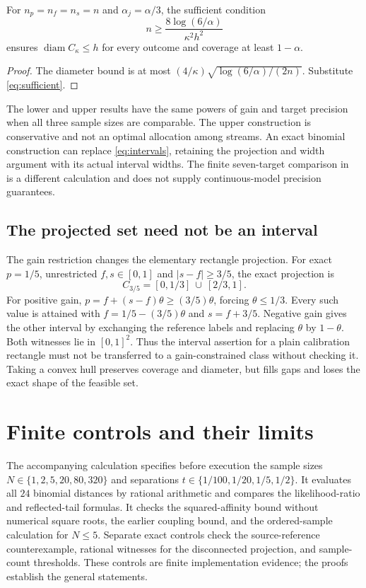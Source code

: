 \documentclass[11pt,a4paper]{article}
\newcommand{\diam}{\operatorname{diam}}
\begin{document}
\begin{corollary}
For $n_p=n_f=n_s=n$ and $\alpha_j=\alpha/3$, the sufficient condition
\begin{equation}
 n\ge\frac{8\log(6/\alpha)}{\kappa^2h^2}
 \label{eq:sufficient}
\end{equation}
ensures $\diam C_\kappa\le h$ for every outcome and coverage at least $1-\alpha$.
\end{corollary}
\begin{proof}
The diameter bound is at most $(4/\kappa)\sqrt{\log(6/\alpha)/(2n)}$. Substitute \eqref{eq:sufficient}.
\end{proof}

The lower and upper results have the same powers of gain and target precision when all three sample sizes are comparable. The upper construction is conservative and not an optimal allocation among streams. An exact binomial construction can replace \eqref{eq:intervals}, retaining the projection and width argument with its actual interval widths. The finite seven-target comparison in~\cite{justusJoint} is a different calculation and does not supply continuous-model precision guarantees.

\subsection{The projected set need not be an interval}

The gain restriction changes the elementary rectangle projection. For exact $p=1/5$, unrestricted $f,s\in[0,1]$ and $|s-f|\ge3/5$, the exact projection is
\[
 C_{3/5}=[0,1/3]\ \cup\ [2/3,1].
\]
For positive gain, $p=f+(s-f)\theta\ge(3/5)\theta$, forcing $\theta\le1/3$. Every such value is attained with $f=1/5-(3/5)\theta$ and $s=f+3/5$. Negative gain gives the other interval by exchanging the reference labels and replacing $\theta$ by $1-\theta$. Both witnesses lie in $[0,1]^2$. Thus the interval assertion for a plain calibration rectangle must not be transferred to a gain-constrained class without checking it. Taking a convex hull preserves coverage and diameter, but fills gaps and loses the exact shape of the feasible set.

\section{Finite controls and their limits}

The accompanying calculation specifies before execution the sample sizes
$N\in\{1,2,5,20,80,320\}$ and separations
$t\in\{1/100,1/20,1/5,1/2\}$. It evaluates all $24$ binomial distances by rational arithmetic and compares the likelihood-ratio and reflected-tail formulas. It checks the squared-affinity bound without numerical square roots, the earlier coupling bound, and the ordered-sample calculation for $N\le5$. Separate exact controls check the source-reference counterexample, rational witnesses for the disconnected projection, and sample-count thresholds. These controls are finite implementation evidence; the proofs establish the general statements.
\end{document}
